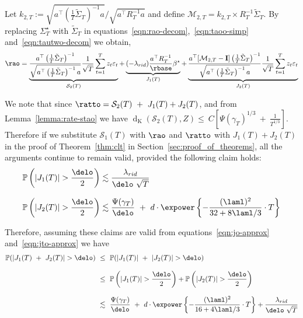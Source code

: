 \documentclass[11pt,letterpaper]{article}
\newcommand{\Prob}{\mathbb{P}}
\newcommand{\rpen}{\lambda_{rid}}
\newcommand{\BT}{{\Sigma^\star_T}}
\newcommand{\Id}{\mathbf{I}}
\newcommand{\z}{z}
\newcommand{\dist}{\operatorname{d}_{\operatorname{K}}}
\newcommand{\err}{\Psi(\gamma_T)}
\newcommand{\PT}{\tilde{\Sigma}_T}
\newcommand{\stao}{\mathcal{S}_1(T)}
\newcommand{\stato}{\mathcal{S}_2(T)}
\theoremstyle{plain}
\theoremstyle{definition}  %
\begin{document}
\noindent Let $k_{2,T} := \sqrt{a^\top  \left( \frac{1}{T} \PT \right)^{-1}  a} / \sqrt{a^\top  R_T^{-1} a}$ and define $\mathcal{M}_{2,T} = k_{2,T} \times  R_T^{-1}\PT$. By replacing $\BT$ with $\PT$ in equations~\eqref{eqn:rao-decom},~\eqref{eqn:taoo-simp} and~\eqref{eqn:tautwo-decom} we obtain,
\begin{align}\label{eqn:vto-decom}
  \rao =  \underbrace{\frac{a^\top \left( \frac{1}{T} \PT \right)^{-1}}{\sqrt{a^\top  \left( \frac{1}{T} \PT \right)^{-1}a}  } \frac{1}{\sqrt{T}} 
  \sum^T_{t=1} \z_t \varepsilon_t }_{\stato}     
  +  \underbrace{(-\rpen) \frac{a^\top R_T^{-1}}{\rbase}  \beta^\star}_{ J_1(T)} 
    + 
  \underbrace{\frac{a^\top [\mathcal{M}_{2,T} - \Id]\left( \frac{1}{T} \PT \right)^{-1}}{\sqrt{a^\top  \left( \frac{1}{T} \PT \right)^{-1}a}  } \frac{1}{\sqrt{T}} 
  \sum^T_{t=1} \z_t \varepsilon_t}_{J_2(T)} 
\end{align}

\noindent We note that since $\ratto = \stato \ + \  J_1(T) + J_2(T)$, and from Lemma~\ref{lemma:rate-stao} we have $\dist \left(\stato,Z \right)
        \leq  \ C \left[ \Psi(\gamma_T)^{1/3} \ + \ \frac{1}{T^{1/3}}  \right]$. Therefore if we substitute $\stao$ with $\rao$ and $\ratto$ with $J_1(T) + J_2(T)$ in the proof of Theorem~\ref{thm:clt} in Section~\ref{sec:proof_of_theorems}, all the arguments continue to remain valid, provided the following claim holds:
\begin{subequations}
    \begin{align}
    &\Prob \left(|J_1(T)| > \frac{\delo}{2} \right) \lesssim \frac{\rpen}{\delo \ \sqrt{T}} \label{eqn:jo-approx}\\[8pt]
    & \Prob \left(|J_2(T)| > \frac{\delo}{2} \right) \lesssim \frac{\err}{\delo} \ + \  d \cdot \expower\left\{ - \frac{(\laml)^2}{32 +  8\laml/3} \cdot  T\right\} \label{eqn:jto-approx}
\end{align}
\end{subequations}

\noindent Therefore, assuming these claims are valid from equations~\eqref{eqn:jo-approx} and~\eqref{eqn:jto-approx} we have
\begin{align}\label{eqn:Jo-Jto-bdd}
\notag
    \Prob(| J_1(T) \ + \ J_2(T)| >\delo)
    &\ \leq \  \Prob(| J_1(T)| \ + \ |J_2(T)| >\delo) \\[8pt] \notag
    &\ \leq  \ \Prob \left(|J_1(T)| > \frac{\delo}{2} \right) 
    +  \Prob \left(|J_2(T)| > \frac{\delo}{2} \right)\\[8pt] 
    & \  \lesssim \  \frac{\err}{\delo} \ + \  d \cdot \expower\left\{ - \frac{(\laml)^2}{16 +  4\laml/3} \cdot  T\right\}
    + \frac{\rpen}{\delo \ \sqrt{T}} 
\end{align}
\end{document}
